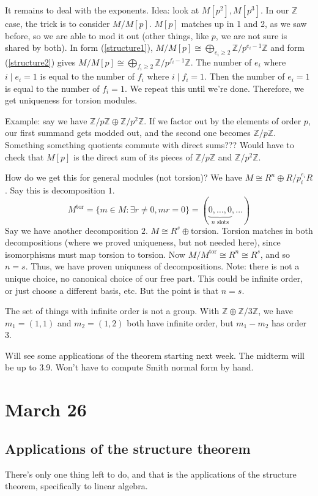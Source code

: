 \documentclass{article}
\theoremstyle{plain}
\theoremstyle{remark}
\newcommand{\Z}{{\mathbb Z}}
\begin{document}
It remains to deal with the exponents.
Idea: look at $M[p^2], M[p^3]$.
In our $\Z$ case, the trick is to consider $M/M[p]$.
$M[p]$ matches up in 1 and 2, as we saw before,
so we are able to mod it out (other things, like $p$, we are not sure is shared by both).
In form (\ref{structure1}), $M/M[p] \cong \bigoplus_{e_i \geq 2} \Z/p^{e_i-1}\Z$
and form (\ref{structure2}) gives $M/M[p] \cong \bigoplus_{f_i \geq 2} \Z/p^{f_i-1}\Z$.
The number of $e_i$ where $i \mid e_i = 1$ is equal to the number of $f_i$
where $i \mid f_i = 1$.
Then the number of $e_i = 1$ is equal to the number of $f_i = 1$.
We repeat this until we're done.
Therefore, we get uniqueness for torsion modules.

Example: say we have $\Z/p\Z \oplus \Z/p^2\Z$.
If we factor out by the elements of order $p$, our first summand gets modded out,
and the second one becomes $\Z/p\Z$.
Something something quotients commute with direct sums???
Would have to check that $M[p]$ is the direct sum of its pieces
of $\Z/p\Z$ and $\Z/p^2\Z$.

How do we get this for general modules (not torsion)?
We have $M \cong R^n \oplus R/p_i^{e_i}R$. Say this is decomposition $1$.
\[
	M^{\text{tor}} = \{m \in M \colon \exists r \neq 0, mr = 0\}
	= (\underbrace{0,\dots,0}_{n\text{ slots}}, \dots)
\]
Say we have another decomposition $2$.
$M \cong R^s \oplus \text{torsion}$.
Torsion matches in both decompositions
(where we proved uniqueness, but not needed here),
since isomorphisms must map torsion to torsion.
Now $M/M^{\text{tor}} \cong R^n \cong R^s$, and so $n = s$.
Thus, we have proven uniquness of decompositions.
Note: there is not a unique choice, no canonical choice of our free part.
This could be infinite order,
or just choose a different basis, etc.
But the point is that $n = s$.

The set of things with infinite order is not a group.
With $\Z \oplus \Z/3\Z$, we have $m_1 = (1,1)$ and $m_2 = (1,2)$
both have infinite order, but $m_1 - m_2$ has order $3$.

Will see some applications of the theorem starting next week.
The midterm will be up to 3.9.
Won't have to compute Smith normal form by hand.


\section{March 26}
\subsection{Applications of the structure theorem}
There's only one thing left to do, and that is the applications of the structure theorem,
specifically to linear algebra.
\end{document}
